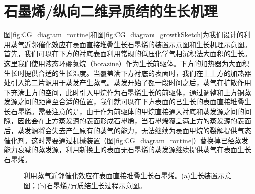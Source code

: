 \section{石墨烯/纵向二维异质结的生长机理}
    \label{cap:CG}
    图\ref{fig:CG_diagram_routine}和图\ref{fig:CG_diagram_growthSketch}为我们设计的利用蒸气近邻催化效应在表面直接堆叠生长石墨烯的装置示意图和生长机理示意图。首先，我们可以在下方的衬底表面利用常规的低压化学气相沉积法大面积的生长。这里我们使用液态环硼氮烷（borazine）作为生长前驱体。下方的加热器为大面积生长时提供合适的生长温度。当覆盖满下方衬底的表面时，我们在上上方的加热器处引入第二片源用于蒸发产生蒸气。蒸发开始了额一段时间之后，蒸气在扩散作用下充满上方的空间，此时引入甲烷作为石墨烯生长的前驱体，通过调整和上方铜蒸发源之间的距离至合适的位置，我们就可以在下方表面的已生长的表面直接堆叠生长石墨烯。需要注意的是，由于作为前驱体的甲烷直接通入衬底和蒸发源之间的间隙，因此会在上方蒸发源的表面形成石墨烯，当石墨烯覆盖满上方的蒸发源的表面后，蒸发源将会失去产生原有的蒸气的能力，无法继续为表面甲烷的裂解提供气态催化剂。这时需要通过机械装置（图\ref{fig:CG_diagram_routine}）替换掉已经蒸发能力衰减的蒸发源，利用新换上的表面无石墨烯的蒸发源继续提供蒸气在表面生长石墨烯。

    \begin{figure}[htb]
        \newline
        \caption{利用蒸气近邻催化效应在表面直接堆叠生长石墨烯。(a)生长装置示意图；(b)石墨烯/异质结生长过程示意图。}
        \label{fig:CG_diagram_CVD}
    \end{figure}


